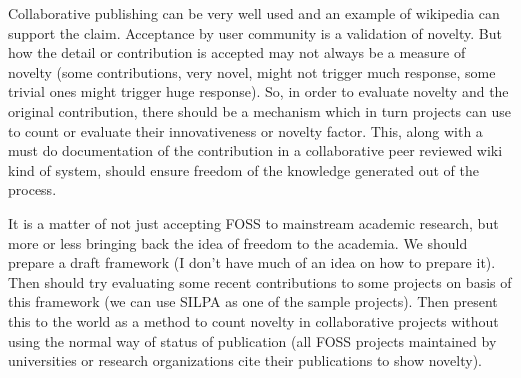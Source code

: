 Collaborative
publishing can be very well used and an example of wikipedia can support the claim.
Acceptance by user community is a validation of novelty. But how the detail
or contribution is accepted may not always be a measure of novelty
(some contributions, very novel, might not trigger much response, some
trivial ones might trigger huge response). So, in order to evaluate novelty and the
original contribution, there should be a mechanism which in turn projects
can use to count or evaluate their innovativeness or novelty factor.
This, along with a must do documentation of the contribution in a collaborative
peer reviewed wiki kind of system, should ensure freedom of the knowledge
generated out of the process.

It is a matter of not just accepting FOSS to
mainstream academic research, but more or less bringing back the idea of
freedom to the academia. We should prepare a draft framework (I don't have
much of an idea on how to prepare it). Then should try evaluating some recent
contributions to some projects on basis of this framework (we can use SILPA
as one of the sample projects). Then present this to the world as a method
to count novelty in collaborative projects without using the normal way of
status of publication (all FOSS projects maintained by universities or research
organizations cite their publications to show novelty).
\newpage
